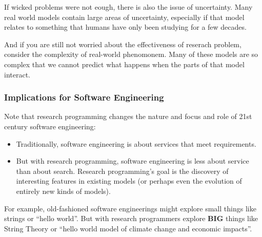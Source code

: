 If wicked problems were not eough, there is also the issue of
uncertainty. Many real world models contain large areas of uncertainty,
especially if that model relates to something that humans have only been
studying for a few decades.

And if you are still not worried about the effectiveness of reserach
problem, consider the complexity of real-world phenomonem. Many of these
models are so complex that we cannot predict what happens when the parts
of that model interact.

\subsubsection{Implications for Software
Engineering}\label{implications-for-software-engineering}

Note that research programming changes the nature and focus and role of
21st century software engineering:

\begin{itemize}
\itemsep1pt\parskip0pt
\item
  Traditionally, software engineering is about services that meet
  requirements.
\item
  But with research programming, software engineering is less about
  service than about search. Research programming's goal is the
  discovery of interesting features in existing models (or perhaps even
  the evolution of entirely new kinds of models).
\end{itemize}

For example, old-fashioned software engineerings might explore small
things like strings or ``hello world''. But with research programmers
explore \textbf{BIG} things like String Theory or ``hello world model of
climate change and economic impacts''.
